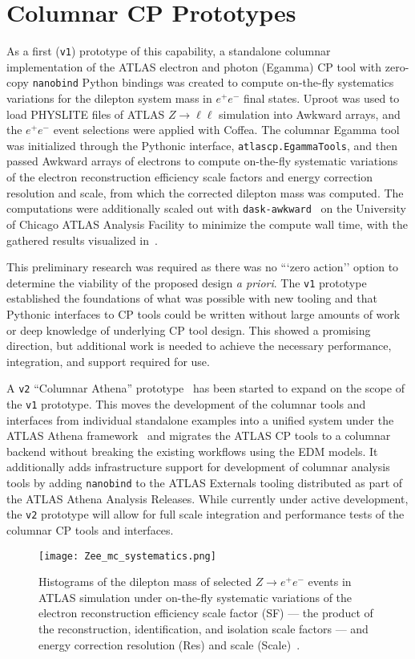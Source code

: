 \section{Columnar CP Prototypes}\label{sec:prototypes}

As a first (\texttt{v1}) prototype of this capability, a standalone columnar implementation of the ATLAS electron and photon (Egamma) CP tool with zero-copy \texttt{nanobind} Python bindings was created to compute on-the-fly systematics variations for the dilepton system mass in $e^{+}e^{-}$ final states.
Uproot was used to load PHYSLITE files of ATLAS $Z\to \ell\ell$ simulation into Awkward arrays, and the $e^{+}e^{-}$ event selections were applied with Coffea.
The columnar Egamma tool was initialized through the Pythonic interface, \texttt{atlascp.EgammaTools}, and then passed Awkward arrays of electrons to compute on-the-fly systematic variations of the electron reconstruction efficiency scale factors and energy correction resolution and scale, from which the corrected dilepton mass was computed.
The computations were additionally scaled out with \texttt{dask-awkward}~\cite{dask_awkward_2024} on the University of Chicago ATLAS Analysis Facility to minimize the compute wall time, with the gathered results visualized in~.

This preliminary research was required as there was no ```zero action'' option to determine the viability of the proposed design \textit{a priori}.
The \texttt{v1} prototype established the foundations of what was possible with new tooling and that Pythonic interfaces to CP tools could be written without large amounts of work or deep knowledge of underlying CP tool design.
This showed a promising direction, but additional work is needed to achieve the necessary performance, integration, and support required for use.

A \texttt{v2} ``Columnar Athena'' prototype~\cite{columnar_athena} has been started to expand on the scope of the \texttt{v1} prototype.
This moves the development of the columnar tools and interfaces from individual standalone examples into a unified system under the ATLAS Athena framework~\cite{ATLAS_Athena} and migrates the ATLAS CP tools to a columnar backend without breaking the existing workflows using the EDM models.
It additionally adds infrastructure support for development of columnar analysis tools by adding \texttt{nanobind} to the ATLAS Externals tooling distributed as part of the ATLAS Athena Analysis Releases.
While currently under active development, the \texttt{v2} prototype will allow for full scale integration and performance tests of the columnar CP tools and interfaces.

\begin{figure}
    \centering
    \texttt{[image: Zee\_mc\_systematics.png]}
    \caption{Histograms of the dilepton mass of selected $Z\to e^{+}e^{-}$ events in ATLAS simulation under on-the-fly systematic variations of the electron reconstruction efficiency scale factor (SF) --- the product of the reconstruction, identification, and isolation scale factors --- and energy correction resolution (Res) and scale (Scale)~\cite{Vigl:ACAT_2024}.}
    \label{fig:Zee_mc_systematics}
\end{figure}
